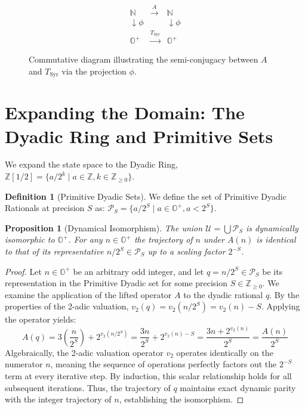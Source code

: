 \documentclass[11pt, a4paper]{article}
\newtheorem{proposition}[theorem]{Proposition}
\theoremstyle{definition}
\newtheorem{definition}[theorem]{Definition}
\begin{document}
\begin{figure}[ht]
    \centering
    \[
    \begin{array}{ccc}
    \mathbb{N} & \xrightarrow{A} & \mathbb{N} \\
    \downarrow{\phi} & & \downarrow{\phi} \\
    \mathbb{O}^{+} & \xrightarrow{T_{\text{Syr}}} & \mathbb{O}^{+}
    \end{array}
    \]
    \caption{Commutative diagram illustrating the semi-conjugacy between $A$ and $T_{\text{Syr}}$ via the projection \(\phi\).}
    \label{fig:semi_conjugacy}
\end{figure}

\section{Expanding the Domain: The Dyadic Ring and Primitive Sets}

We expand the state space to the Dyadic Ring, $\mathbb{Z}[1/2] = \{a/2^k \mid a \in \mathbb{Z}, k \in \mathbb{Z}_{\ge 0}\}$.

\begin{definition}[Primitive Dyadic Sets]
We define the set of Primitive Dyadic Rationals at precision $S$ as:
$\mathcal{P}_{S}=\{a/2^{S} \mid a \in \mathbb{O}^{+}, a < 2^{S}\}$.
\end{definition}

\begin{proposition}[Dynamical Isomorphism]
\label{thm:isomorphism}
The union $\mathcal{U} = \bigcup \mathcal{P}_S$ is dynamically isomorphic to $\mathbb{O}^{+}$. For any $n\in\mathbb{O}^{+}$ the trajectory of $n$ under $A(n)$ is identical to that of its representative $n/2^{S} \in \mathcal{P}_{S}$ up to a scaling factor $2^{-S}$.
\end{proposition}

\begin{proof}
Let $n \in \mathbb{O}^+$ be an arbitrary odd integer, and let $q = n/2^S \in \mathcal{P}_S$ be its representation in the Primitive Dyadic set for some precision $S \in \mathbb{Z}_{\ge 0}$. We examine the application of the lifted operator $A$ to the dyadic rational $q$. By the properties of the 2-adic valuation, $v_2(q) = v_2(n/2^S) = v_2(n) - S$. Applying the operator yields:
\begin{equation*}
A(q) = 3\left(\frac{n}{2^S}\right) + 2^{v_2(n/2^S)} = \frac{3n}{2^S} + 2^{v_2(n)-S} = \frac{3n + 2^{v_2(n)}}{2^S} = \frac{A(n)}{2^S}
\end{equation*}
Algebraically, the 2-adic valuation operator $v_2$ operates identically on the numerator $n$, meaning the sequence of operations perfectly factors out the $2^{-S}$ term at every iterative step. By induction, this scalar relationship holds for all subsequent iterations. Thus, the trajectory of $q$ maintains exact dynamic parity with the integer trajectory of $n$, establishing the isomorphism.
\end{proof}
\end{document}
